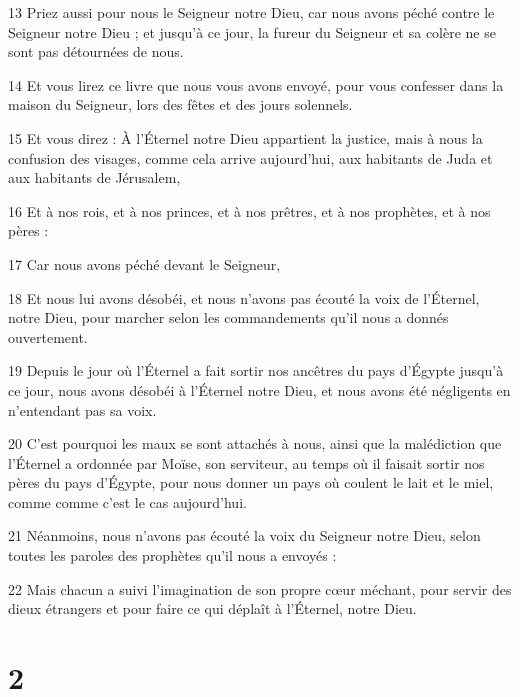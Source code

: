 \par 13 Priez aussi pour nous le Seigneur notre Dieu, car nous avons péché contre le Seigneur notre Dieu ; et jusqu'à ce jour, la fureur du Seigneur et sa colère ne se sont pas détournées de nous.
\par 14 Et vous lirez ce livre que nous vous avons envoyé, pour vous confesser dans la maison du Seigneur, lors des fêtes et des jours solennels.
\par 15 Et vous direz : À l'Éternel notre Dieu appartient la justice, mais à nous la confusion des visages, comme cela arrive aujourd'hui, aux habitants de Juda et aux habitants de Jérusalem,
\par 16 Et à nos rois, et à nos princes, et à nos prêtres, et à nos prophètes, et à nos pères :
\par 17 Car nous avons péché devant le Seigneur,
\par 18 Et nous lui avons désobéi, et nous n'avons pas écouté la voix de l'Éternel, notre Dieu, pour marcher selon les commandements qu'il nous a donnés ouvertement.
\par 19 Depuis le jour où l'Éternel a fait sortir nos ancêtres du pays d'Égypte jusqu'à ce jour, nous avons désobéi à l'Éternel notre Dieu, et nous avons été négligents en n'entendant pas sa voix.
\par 20 C'est pourquoi les maux se sont attachés à nous, ainsi que la malédiction que l'Éternel a ordonnée par Moïse, son serviteur, au temps où il faisait sortir nos pères du pays d'Égypte, pour nous donner un pays où coulent le lait et le miel, comme comme c'est le cas aujourd'hui.
\par 21 Néanmoins, nous n'avons pas écouté la voix du Seigneur notre Dieu, selon toutes les paroles des prophètes qu'il nous a envoyés :
\par 22 Mais chacun a suivi l'imagination de son propre cœur méchant, pour servir des dieux étrangers et pour faire ce qui déplaît à l'Éternel, notre Dieu.

\chapter{2}

